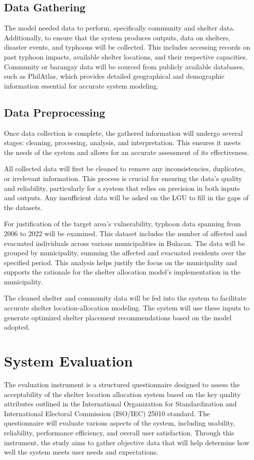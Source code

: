 \subsection{Data Gathering}
	The model needed data to perform, specifically community and shelter data. Additionally, to ensure that the system produces outputs, data on shelters, disaster events, and typhoons will be collected. This includes accessing records on past typhoon impacts, available shelter locations, and their respective capacities. Community or barangay data will be sourced from publicly available databases, such as PhilAtlas, which provides detailed geographical and demographic information essential for accurate system modeling.
	
\subsection{Data Preprocessing}
	Once data collection is complete, the gathered information will undergo several stages: cleaning, processing, analysis, and interpretation. This ensures it meets the needs of the system and allows for an accurate assessment of its effectiveness.
	
	All collected data will first be cleaned to remove any inconsistencies, duplicates, or irrelevant information. This process is crucial for ensuring the data’s quality and reliability, particularly for a system that relies on precision in both inputs and outputs. Any insufficient data will be asked on the LGU to fill in the gaps of the datasets. 
	
	For justification of the target area’s vulnerability, typhoon data spanning from 2006 to 2022 will be examined. This dataset includes the number of affected and evacuated individuals across various municipalities in Bulacan. The data will be grouped by municipality, summing the affected and evacuated residents over the specified period. This analysis helps justify the focus on the municipality and supports the rationale for the shelter allocation model’s implementation in the municipality.
	
	The cleaned shelter and community data will be fed into the system to facilitate accurate shelter location-allocation modeling. The system will use these inputs to generate optimized shelter placement recommendations based on the model adopted.
	
	
\section{System Evaluation}
	The evaluation instrument is a structured questionnaire designed to assess the acceptability of the shelter location allocation system based on the key quality attributes outlined in the International Organization for Standardization and International Electoral Commission (ISO/IEC) 25010 standard. The questionnaire will evaluate various aspects of the system, including usability, reliability, performance efficiency, and overall user satisfaction. Through this instrument, the study aims to gather objective data that will help determine how well the system meets user needs and expectations. \parencite{ISOIEC2023}

